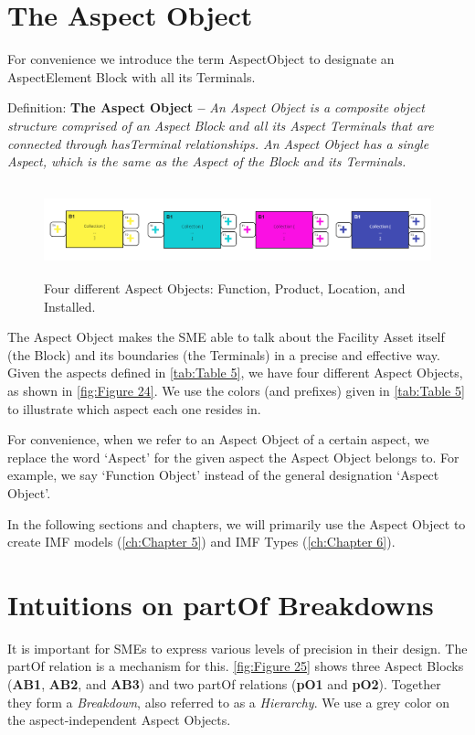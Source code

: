 \section{The Aspect Object}
For convenience we introduce the term AspectObject to designate an AspectElement Block
with all its Terminals.

Definition: \textbf{The Aspect Object -- }\textit{An Aspect Object is a composite object structure comprised of an
  Aspect Block}\textbf{\textit{ }}\textit{and all its Aspect Terminals that are connected through hasTerminal
  relationships. An Aspect Object has a single Aspect, which is the same as the Aspect of the Block and its Terminals.
}

\begin{figure}[htb]
  \centering
  \includegraphics[width=6.5in,height=1.04931in]{img/IMFmanual-img043.png}
  \caption{Four different Aspect Objects: Function, Product, Location, and Installed.}
  \label{fig:Figure 24}
\end{figure}

The Aspect Object makes the SME able to talk about the Facility Asset itself (the Block) and its boundaries (the
Terminals) in a precise and effective way. Given the aspects defined in \autoref{tab:Table 5}, we have four different Aspect
Objects, as shown in \autoref{fig:Figure 24}. We use the colors (and prefixes) given in \autoref{tab:Table 5} to illustrate which aspect each one
resides in.

For convenience, when we refer to an Aspect Object of a certain aspect, we replace the word `Aspect' for the given
aspect the Aspect Object belongs to. For example, we say `Function Object' instead of the general designation `Aspect
Object'.

In the following sections and chapters, we will primarily use the Aspect Object to create IMF models (\autoref{ch:Chapter 5}) and
IMF Types (\autoref{ch:Chapter 6}).

\section{Intuitions on partOf Breakdowns}
\label{ch:Section 4.4}
It is important for SMEs to express various levels of precision in
their design. The partOf relation is a mechanism for this. \autoref{fig:Figure 25} shows three Aspect Blocks (\textbf{AB1},
\textbf{AB2}, and \textbf{AB3}) and two partOf relations (\textbf{pO1} and \textbf{pO2}). Together they form a
\emph{Breakdown}, also referred to as a \emph{Hierarchy}. We use a grey color on the aspect-independent Aspect
Objects.

